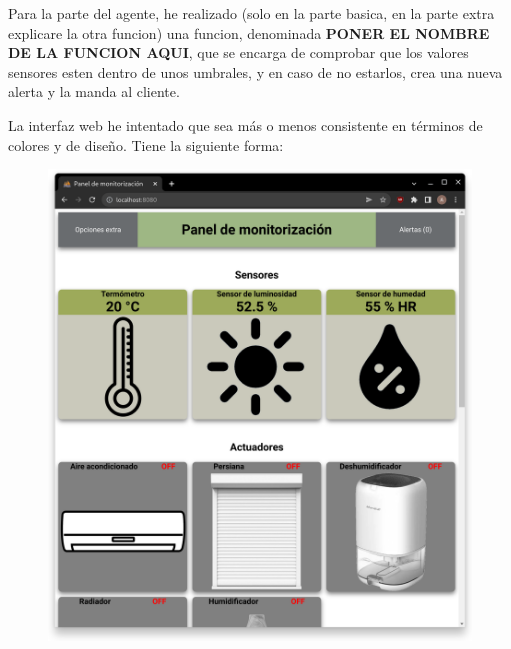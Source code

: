 \documentclass{article}
\begin{document}
Para la parte del agente, he realizado (solo en la parte basica, en la parte extra explicare la otra funcion) una funcion, denominada \textbf{PONER EL NOMBRE DE LA FUNCION AQUI}, que se encarga de comprobar que los valores sensores esten dentro de unos umbrales, y en caso de no estarlos, crea una nueva alerta y la manda al cliente.

La interfaz web he intentado que sea más o menos consistente en términos de colores y de diseño. Tiene la siguiente forma:

\begin{figure}[H]
    \centering
    \begin{minipage}[H]{0.49\textwidth}
        \centering
        \includegraphics[width=\textwidth]{images/pagina1.png}
    \end{minipage}
    \hfill
    \begin{minipage}[H]{0.49\textwidth}
        \centering

\end{minipage}
\end{figure}
\end{document}
